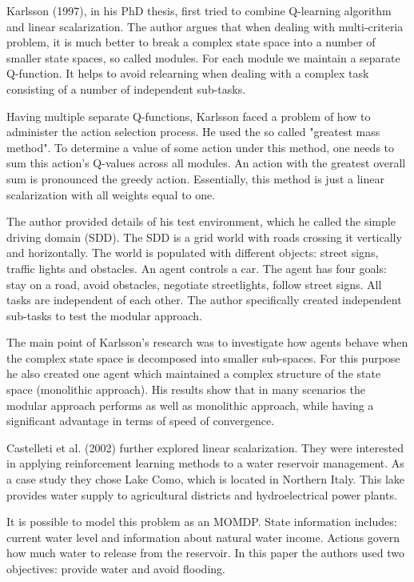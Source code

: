 Karlsson (1997)\nocite{Karlsson97learningto}, in his PhD thesis, first tried to combine Q-learning algorithm and linear scalarization. The author argues that when dealing with multi-criteria problem, it is much better to break a complex state space into a number of smaller state spaces, so called modules. For each module we maintain a separate Q-function. It helps to avoid relearning when dealing with a complex task consisting of a number of independent sub-tasks.

Having multiple separate Q-functions, Karlsson faced a problem of how to administer the action selection process. He used the so called "greatest mass method". To determine a value of some action under this method, one needs to sum this action's Q-values across all modules. An action with the greatest overall sum is pronounced the greedy action. Essentially, this method is just a linear scalarization with all weights equal to one.

The author provided details of his test environment, which he called the simple driving domain (SDD). The SDD is a grid world with roads crossing it vertically and horizontally. The world is populated with different objects: street signs, traffic lights and obstacles. An agent controls a car. The agent has four goals: stay on a road, avoid obstacles, negotiate streetlights, follow street signs. All tasks are independent of each other. The author specifically created independent sub-tasks to test the modular approach.

The main point of Karlsson's research was to investigate how agents behave when the complex state space is decomposed into smaller sub-spaces. For this purpose he also created one agent which maintained a complex structure of the state space (monolithic approach). His results show that in many scenarios the modular approach performs as well as monolithic approach, while having a significant advantage in terms of speed of convergence.

Castelleti et al. (2002)\nocite{castelletti2002reinforcement} further explored linear scalarization. They were interested in applying reinforcement learning methods to a water reservoir management. As a case study they chose Lake Como, which is located in Northern Italy. This lake provides water supply to agricultural districts and hydroelectrical power plants.

It is possible to model this problem as an MOMDP. State information includes: current water level and information about natural water income. Actions govern how much water to release from the reservoir. In this paper the authors used two objectives: provide water and avoid flooding.

